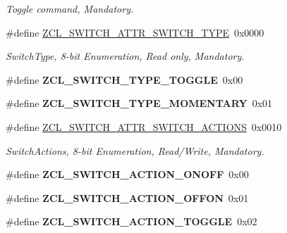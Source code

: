 \begin{DoxyCompactItemize}
\begin{DoxyCompactList}\small\item\em Toggle command, Mandatory. \end{DoxyCompactList}\item 
\hypertarget{group__zcl__onoff_ga515413fcce31bf79d2bd46fb28c93a2e}{\#define \hyperlink{group__zcl__onoff_ga515413fcce31bf79d2bd46fb28c93a2e}{Z\-C\-L\-\_\-\-S\-W\-I\-T\-C\-H\-\_\-\-A\-T\-T\-R\-\_\-\-S\-W\-I\-T\-C\-H\-\_\-\-T\-Y\-P\-E}~0x0000}\label{group__zcl__onoff_ga515413fcce31bf79d2bd46fb28c93a2e}

\begin{DoxyCompactList}\small\item\em Switch\-Type, 8-\/bit Enumeration, Read only, Mandatory. \end{DoxyCompactList}\item 
\hypertarget{group__zcl__onoff_ga046e143f5f7685aff4cd2a25ae626bbf}{\#define {\bfseries Z\-C\-L\-\_\-\-S\-W\-I\-T\-C\-H\-\_\-\-T\-Y\-P\-E\-\_\-\-T\-O\-G\-G\-L\-E}~0x00}\label{group__zcl__onoff_ga046e143f5f7685aff4cd2a25ae626bbf}

\item 
\hypertarget{group__zcl__onoff_ga567b4d099adf0574a0cf616a763528f3}{\#define {\bfseries Z\-C\-L\-\_\-\-S\-W\-I\-T\-C\-H\-\_\-\-T\-Y\-P\-E\-\_\-\-M\-O\-M\-E\-N\-T\-A\-R\-Y}~0x01}\label{group__zcl__onoff_ga567b4d099adf0574a0cf616a763528f3}

\item 
\hypertarget{group__zcl__onoff_ga2ca3d5c19e5422fe71c9389045603a9d}{\#define \hyperlink{group__zcl__onoff_ga2ca3d5c19e5422fe71c9389045603a9d}{Z\-C\-L\-\_\-\-S\-W\-I\-T\-C\-H\-\_\-\-A\-T\-T\-R\-\_\-\-S\-W\-I\-T\-C\-H\-\_\-\-A\-C\-T\-I\-O\-N\-S}~0x0010}\label{group__zcl__onoff_ga2ca3d5c19e5422fe71c9389045603a9d}

\begin{DoxyCompactList}\small\item\em Switch\-Actions, 8-\/bit Enumeration, Read/\-Write, Mandatory. \end{DoxyCompactList}\item 
\hypertarget{group__zcl__onoff_gaf7aebb04ff54e953ad6fab425b59b82c}{\#define {\bfseries Z\-C\-L\-\_\-\-S\-W\-I\-T\-C\-H\-\_\-\-A\-C\-T\-I\-O\-N\-\_\-\-O\-N\-O\-F\-F}~0x00}\label{group__zcl__onoff_gaf7aebb04ff54e953ad6fab425b59b82c}

\item 
\hypertarget{group__zcl__onoff_gac32f070ae508e84d80d0d389d24fe5cf}{\#define {\bfseries Z\-C\-L\-\_\-\-S\-W\-I\-T\-C\-H\-\_\-\-A\-C\-T\-I\-O\-N\-\_\-\-O\-F\-F\-O\-N}~0x01}\label{group__zcl__onoff_gac32f070ae508e84d80d0d389d24fe5cf}

\item 
\hypertarget{group__zcl__onoff_ga5924f219a203d07537f949e44842dd60}{\#define {\bfseries Z\-C\-L\-\_\-\-S\-W\-I\-T\-C\-H\-\_\-\-A\-C\-T\-I\-O\-N\-\_\-\-T\-O\-G\-G\-L\-E}~0x02}\label{group__zcl__onoff_ga5924f219a203d07537f949e44842dd60}

\end{DoxyCompactItemize}
